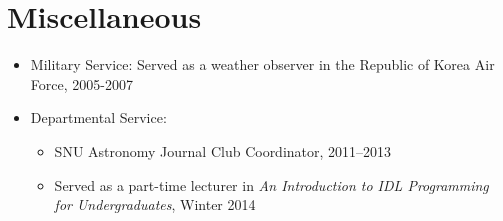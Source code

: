 \documentclass[11pt,letterpaper,roman]{moderncv}        %
\begin{document}
\section*{Miscellaneous}
\begin{itemize}
\item Military Service: Served as a weather observer in the Republic of Korea Air Force, 2005-2007
\end{itemize}
\begin{itemize}
\item Departmental Service:
  \begin{itemize}
  \item SNU Astronomy Journal Club Coordinator, 2011--2013
  \item Served as a part-time lecturer in \textit{An Introduction to
      IDL Programming for Undergraduates}, Winter 2014
\end{itemize}
\end{itemize}




\end{document}
